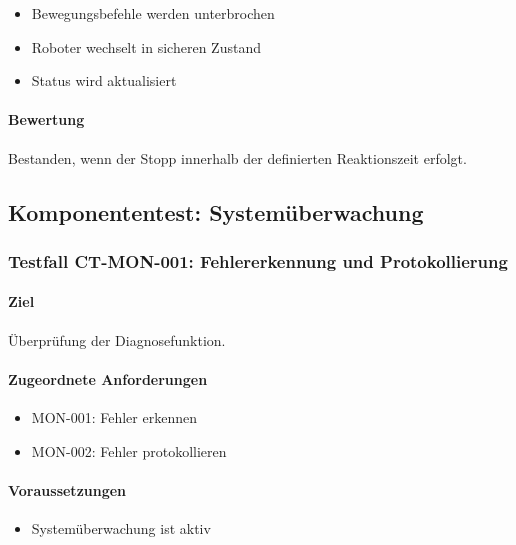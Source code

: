 \documentclass[
  a4paper,
  12pt,
  DIV=12,        %
  parskip=half,  %
  headings=small %
]{scrartcl}
\theoremstyle{definition}
\providecommand{\tightlist}{%
  \setlength{\itemsep}{0pt}\setlength{\parskip}{0pt}}
\theoremstyle{definition}
\begin{document}
\begin{itemize}
\tightlist
\item
  Bewegungsbefehle werden unterbrochen
\item
  Roboter wechselt in sicheren Zustand
\item
  Status wird aktualisiert
\end{itemize}

\paragraph{Bewertung}\label{bewertung-7}

Bestanden, wenn der Stopp innerhalb der definierten Reaktionszeit
erfolgt.

\subsection{Komponententest:
Systemüberwachung}\label{komponententest-systemuxfcberwachung}

\subsubsection{Testfall CT-MON-001: Fehlererkennung und
Protokollierung}\label{testfall-ct-mon-001-fehlererkennung-und-protokollierung}

\paragraph{Ziel}\label{ziel-8}

Überprüfung der Diagnosefunktion.

\paragraph{Zugeordnete Anforderungen}\label{zugeordnete-anforderungen-8}

\begin{itemize}
\tightlist
\item
  MON-001: Fehler erkennen
\item
  MON-002: Fehler protokollieren
\end{itemize}

\paragraph{Voraussetzungen}\label{voraussetzungen-8}

\begin{itemize}
\tightlist
\item
  Systemüberwachung ist aktiv
\end{itemize}
\end{document}
